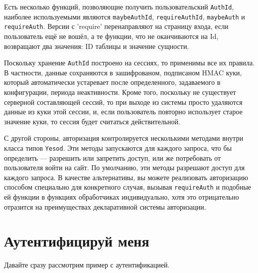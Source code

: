 Есть несколько функций, позволяющие получить пользовательский \lstinline'AuthId', наиболее используемыми являются \lstinline'maybeAuthId', \lstinline'requireAuthId', \lstinline'maybeAuth' и \lstinline'requireAuth'. Версии с 'require' перенаправляют на страницу входа, если пользователь ещё не вошёл, а те функции, что не оканчиваются на Id, возвращают два значения: ID таблицы и значение сущности.

Поскольку хранение \lstinline'AuthId' построено на сессиях, то применимы все их правила. В частности, данные сохраняются в зашифрованом, подписаном HMAC куки, который автоматически устаревает после определенного, задаваемого в конфигурации, периода неактивности. Кроме того, поскольку не существует серверной составляющей сессий, то при выходе из системы просто удаляются данные из куки этой сессии, и, если пользователь повторно использует старое значение куки, то сессия будет считаться действительной.

С другой стороны, авторизация контролируется несколькими методами внутри класса типов \lstinline'Yesod'. Эти методы запускаются для каждого запроса, что бы определить --- разрешить или запретить доступ, или же потребовать от пользователя войти на сайт. По умолчанию, эти методы разрешают доступ для каждого запроса. В качестве альтернативы, вы можете реализовать авторизацию способом специально для конкретного случая, вызывая \lstinline'requireAuth' и подобные ей функции в функциях обработчиках индивидуально, хотя это отрицательно отразится на преимуществах декларативной системы авторизации.

\section{Аутентифицируй меня}

Давайте сразу рассмотрим пример с аутентификацией.


